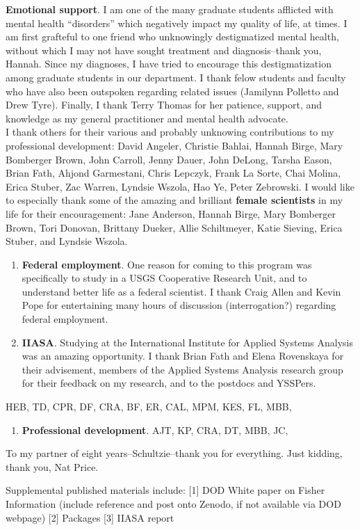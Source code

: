 \documentclass[12pt,twoside]{reedthesis}
\providecommand{\tightlist}{%
  \setlength{\itemsep}{0pt}\setlength{\parskip}{0pt}}
\def\labelenumi{\arabic{enumi}.}
\def\labelenumi{\arabic{enumi}.}
\begin{document}
\begin{acknowledgements}
    \textbf{Emotional support}. I am one of the many graduate students afflicted with mental health ``disorders'' which negatively impact my quality of life, at times. I am first grafteful to one friend who unknowingly destigmatized mental health, without which I may not have sought treatment and diagnosis--thank you, Hannah. Since my diagnoses, I have tried to encourage this destigmatization among graduate students in our department. I thank felow students and faculty who have also been outspoken regarding related issues (Jamilynn Polletto and Drew Tyre). Finally, I thank Terry Thomas for her patience, support, and knowledge as my general practitioner and mental health advocate.\\
    I thank others for their various and probably unknowing contributions to my professional development: David Angeler, Christie Bahlai, Hannah Birge, Mary Bomberger Brown, John Carroll, Jenny Dauer, John DeLong, Tarsha Eason, Brian Fath, Ahjond Garmestani, Chris Lepczyk, Frank La Sorte, Chai Molina, Erica Stuber, Zac Warren, Lyndsie Wszola, Hao Ye, Peter Zebrowski.
    I would like to especially thank some of the amazing and brilliant \textbf{female scientists} in my life for their encouragement: Jane Anderson, Hannah Birge, Mary Bomberger Brown, Tori Donovan, Brittany Dueker, Allie Schiltmeyer, Katie Sieving, Erica Stuber, and Lyndsie Wszola.
    \begin{enumerate}
    \def\labelenumi{\arabic{enumi}.}
    \item
      \textbf{Federal employment}. One reason for coming to this program was specifically to study in a USGS Cooperative Research Unit, and to understand better life as a federal scientist. I thank Craig Allen and Kevin Pope for entertaining many hours of discussion (interrogation?) regarding federal employment.
    \item
      \textbf{IIASA}. Studying at the International Institute for Applied Systems Analysis was an amazing opportunity. I thank Brian Fath and Elena Rovenskaya for their advisement, members of the Applied Systems Analysis research group for their feedback on my research, and to the postdocs and YSSPers.
    \end{enumerate}
    HEB, TD, CPR, DF, CRA, BF, ER, CAL, MPM, KES, FL, MBB,
    \begin{enumerate}
    \def\labelenumi{\arabic{enumi}.}
    \tightlist
    \item
      \textbf{Professional development}. AJT, KP, CRA, DT, MBB, JC,
    \end{enumerate}
    To my partner of eight years--Schultzie--thank you for everything. Just kidding, thank you, Nat Price.
  \end{acknowledgements}
  \begin{preface}
    Supplemental published materials include:
    {[}1{]} DOD White paper on Fisher Information (include reference and post onto Zenodo, if not available via DOD webpage)
    {[}2{]} Packages
    {[}3{]} IIASA report
  \end{preface}
  \hypersetup{linkcolor=black}
  \setcounter{tocdepth}{2}
  \tableofcontents
\end{document}
